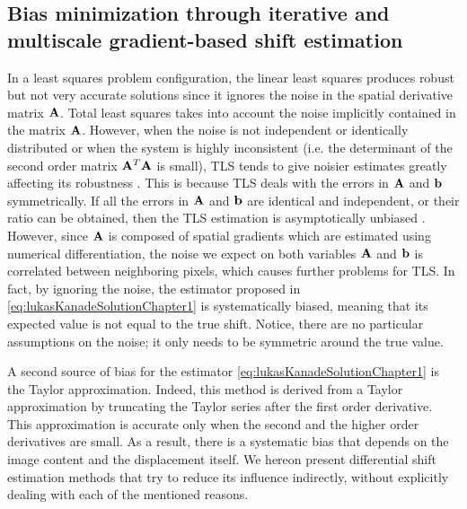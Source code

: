 \subsection{Bias minimization through iterative and multiscale gradient-based shift estimation}
\label{sec:iterativeAndMultiScale}
In a least squares problem configuration, the linear least squares produces robust but not very accurate solutions since it ignores the noise in the spatial derivative matrix $\mathbf{A}$. Total least squares takes into account the noise implicitly contained in the matrix $\mathbf{A}$. However, when the noise is not independent or identically distributed or when the system is highly inconsistent (i.e. the determinant of the second order matrix $\mathbf{A}^T\mathbf{A}$ is small), TLS tends to give noisier estimates greatly affecting its robustness \cite{NG2001}. This is because TLS deals with the errors in $\mathbf{A}$ and $\mathbf{b}$ symmetrically. If all the errors in $\mathbf{A}$ and $\mathbf{b}$ are identical and independent, or their ratio can be obtained, then the TLS estimation is asymptotically unbiased \cite{Ji2006}. However, since $\mathbf{A}$ is composed of spatial gradients which are estimated using numerical differentiation, the noise we expect on both variables $\mathbf{A}$ and $\mathbf{b}$ is correlated between neighboring pixels, which causes further problems for TLS. In fact, by ignoring the noise, the estimator proposed in \eqref{eq:lukasKanadeSolutionChapter1} is systematically biased, meaning that its expected value is not equal to the true shift. Notice, there are no particular assumptions on the noise; it only needs to be symmetric around the true value.

A second source of bias for the estimator \eqref{eq:lukasKanadeSolutionChapter1} is the Taylor approximation. Indeed, this method is derived from a Taylor approximation by truncating the Taylor series after the first order derivative. This approximation is accurate only when the second and the higher order derivatives are small. As a result, there is a systematic bias that depends on the image content and the displacement itself.
We hereon present differential shift estimation methods that try to reduce its influence indirectly, without explicitly dealing with each of the mentioned reasons. 

